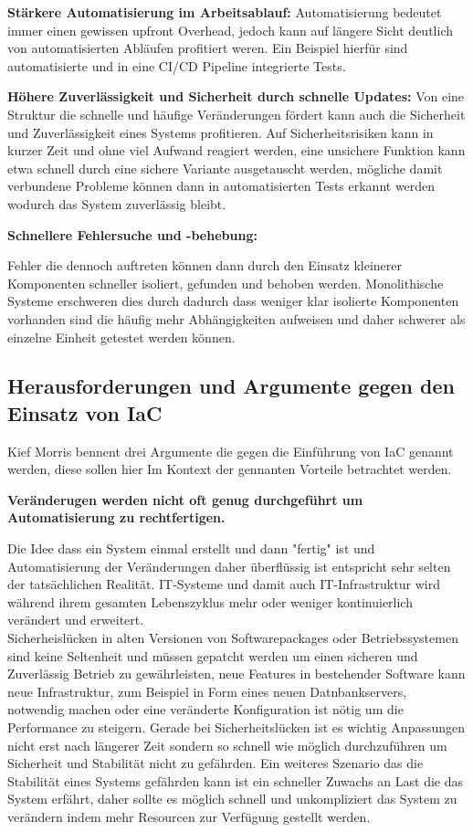 \begin{spacing}{1.2}
\textbf{Stärkere Automatisierung im Arbeitsablauf:} Automatisierung
bedeutet immer einen gewissen upfront Overhead, jedoch kann auf
längere Sicht deutlich von automatisierten Abläufen profitiert weren.
Ein Beispiel hierfür sind automatisierte und in eine CI/CD Pipeline
integrierte Tests.

\textbf{Höhere Zuverlässigkeit und Sicherheit durch schnelle Updates:}
Von eine Struktur die schnelle und häufige Veränderungen fördert
kann auch die Sicherheit und Zuverlässigkeit eines Systems profitieren.
Auf Sicherheitsrisiken kann in kurzer Zeit und ohne viel Aufwand
reagiert werden, eine unsichere Funktion kann etwa schnell durch
eine sichere Variante ausgetauscht werden, mögliche damit verbundene
Probleme können dann in automatisierten Tests erkannt werden wodurch
das System zuverlässig bleibt.

\textbf{Schnellere Fehlersuche und -behebung:}

Fehler die dennoch auftreten können dann durch den Einsatz kleinerer
Komponenten schneller isoliert, gefunden und behoben werden.
Monolithische Systeme erschweren dies durch dadurch dass weniger klar
isolierte Komponenten vorhanden sind die häufig mehr Abhängigkeiten
aufweisen und daher schwerer als einzelne Einheit getestet werden können.

\subsection{Herausforderungen und Argumente gegen den Einsatz von IaC}

Kief Morris bennent drei Argumente die gegen die Einführung von IaC
genannt werden, diese sollen hier Im Kontext der gennanten Vorteile betrachtet
werden.

\textbf{Veränderugen werden nicht oft genug durchgeführt um
Automatisierung zu rechtfertigen.}

Die Idee dass ein System einmal erstellt und dann "fertig" ist und
Automatisierung der Veränderungen daher überflüssig ist 
entspricht sehr selten der tatsächlichen Realität.
IT-Systeme und damit auch IT-Infrastruktur wird während ihrem gesamten
Lebenszyklus mehr oder weniger kontinuierlich verändert und erweitert.\\
Sicherheislücken in alten Versionen von Softwarepackages oder
Betriebssystemen sind keine Seltenheit und müssen gepatcht werden um
einen sicheren und Zuverlässig Betrieb zu gewährleisten, neue Features
in bestehender Software kann neue Infrastruktur, zum Beispiel in Form eines
neuen Datnbankservers, notwendig machen oder eine veränderte Konfiguration
ist nötig um die Performance zu steigern. Gerade bei Sicherheitslücken
ist es wichtig Anpassungen nicht erst nach längerer Zeit sondern so
schnell wie möglich durchzuführen um Sicherheit und Stabilität nicht
zu gefährden. Ein weiteres Szenario das die Stabilität eines Systems
gefährden kann ist ein schneller Zuwachs an Last die das System erfährt,
daher sollte es möglich schnell und unkompliziert das System zu verändern
indem mehr Resourcen zur Verfügung gestellt werden.


\end{spacing}
